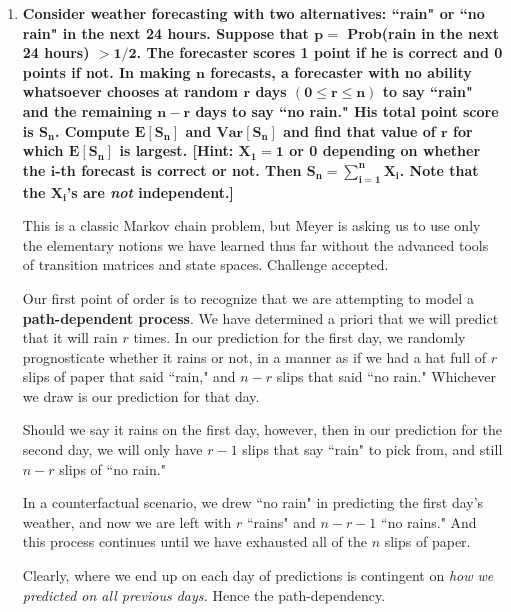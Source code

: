 \documentclass[10pt, oneside]{article}   	%
\theoremstyle{definition}
\begin{document}
\begin{enumerate}[label=7.\arabic*]
\begin{enumerate}
	  
	  
	\end{enumerate}

\newpage
\item  \begin{tcolorbox}[
  colback=Cerulean!5!white,
  colframe=Cerulean!75!black]
\textbf{Consider weather forecasting with two alternatives: ``rain" or ``no rain" in the next 24 hours. Suppose that $\bm{p = }$ Prob(rain in the next 24 hours) $\bm{> 1/2}$. The forecaster scores 1 point if he is correct and 0 points if not. In making $\bm{n}$ forecasts, a forecaster with no ability whatsoever chooses at random $\bm{r}$ days $\bm{(0 \leq r \leq n)}$ to say ``rain" and the remaining $\bm{n-r}$ days to say ``no rain." His total point score is $\bm{S_n}$. Compute $\bm{E[S_n]}$ and $\bm{Var[S_n]}$ and find that value of $\bm{r}$ for which $\bm{E[S_n]}$ is largest. [Hint: $\bm{X_1 = 1}$ or 0 depending on whether the $\bm{i}$-th forecast is correct or not. Then $\bm{S_n = \sum^n_{i=1} X_i}$. Note that the $\bm{X_i}$'s are \textit{not} independent.] }
\end{tcolorbox}

This is a classic Markov chain problem, but Meyer is asking us to use only the elementary notions we have learned thus far without the advanced tools of transition matrices and state spaces. Challenge accepted.

Our first point of order is to recognize that we are attempting to model a \textbf{path-dependent process}. We have determined a priori that we will predict that it will rain $r$ times. In our prediction for the first day, we randomly prognosticate whether it rains or not, in a manner as if we had a hat full of $r$ slips of paper that said ``rain," and $n-r$ slips that said ``no rain." Whichever we draw is our prediction for that day. 

Should we say it rains on the first day, however, then in our prediction for the second day, we will only have $r-1$ slips that say ``rain" to pick from, and still $n-r$ slips of ``no rain." 

In a counterfactual scenario, we drew ``no rain" in predicting the first day's weather, and now we are left with $r$ ``rains" and $n-r-1$ ``no rains." And this process continues until we have exhausted all of the $n$ slips of paper. 

Clearly, where we end up on each day of predictions is contingent on \textit{how we predicted on all previous days.} Hence the path-dependency.

\end{enumerate}
\end{document}
